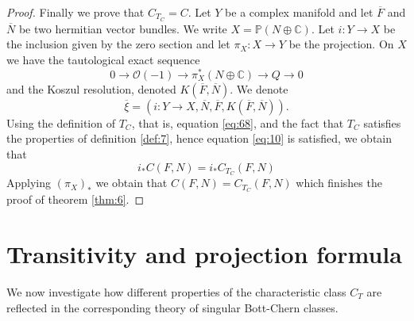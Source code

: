 \documentclass[10pt,twoside]{article}
\numberwithin{equation}{section}
\theoremstyle{plain}
\theoremstyle{definition}
\begin{document}
\begin{proof}
  Finally we prove that $C_{T_{C}}=C$. Let $Y$ be a complex 
  manifold and let $\overline F$ and $\overline N$ be two hermitian
  vector bundles. We write $X=\mathbb{P}(N\oplus \mathbb{C})$. Let
  $i\colon Y\longrightarrow X$ be the inclusion given by the zero
  section and let
  $\pi _{X}\colon X\longrightarrow Y$ be the projection. On $X$ we have the
  tautological exact sequence
  \begin{displaymath}
    0\longrightarrow \mathcal{O}(-1)\longrightarrow 
    \pi _{X}^{\ast}(N\oplus \mathbb{C})\longrightarrow
    Q\longrightarrow 0 
  \end{displaymath}
  and the Koszul resolution, denoted $K(\overline F,\overline N)$.
  We denote $$\overline {\xi}= (i\colon Y\longrightarrow
  X,\overline N, \overline 
  F,K(\overline F,\overline N)).$$
  Using the definition of $T_{C}$, that is, equation \eqref{eq:68},
  and the fact that $T_{C}$ satisfies the properties of definition
  \ref{def:7}, hence equation \eqref{eq:10} is satisfied, we obtain
  that
  \begin{displaymath}
    i_{\ast}C(F,N)=i_{\ast}C_{T_{C}}(F,N)
  \end{displaymath}
  Applying $(\pi _{X})_{\ast}$ we obtain that
  $C(F,N)=C_{T_{C}}(F,N)$ which finishes the proof of theorem
\ref{thm:6}. 
\end{proof}


\section{Transitivity and projection formula}
\label{sec:trans-mult}



We now investigate how different properties of the characteristic
class $C_{T}$ are reflected in the corresponding theory of singular
Bott-Chern classes. 
\end{document}
